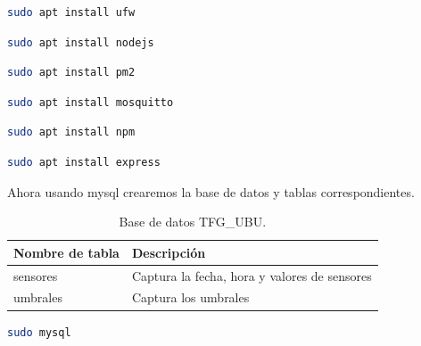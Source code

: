 \begin{lstlisting}[language=sh, firstnumber=0, basicstyle=\normalsize, caption={Comando para instalar ufw.}] 
sudo apt install ufw\end{lstlisting}


\begin{lstlisting}[language=sh, firstnumber=0, basicstyle=\normalsize, caption={Comando para instalar node.js.}] 
sudo apt install nodejs\end{lstlisting}

\begin{lstlisting}[language=sh, firstnumber=0, basicstyle=\normalsize, caption={Comando para instalar pm2.}] 
sudo apt install pm2\end{lstlisting}

\begin{lstlisting}[language=sh, firstnumber=0, basicstyle=\normalsize, caption={Comando para instalar mosquitto.}] 
sudo apt install mosquitto\end{lstlisting}

\begin{lstlisting}[language=sh, firstnumber=0, basicstyle=\normalsize, caption={Comando para instalar npm.}] 
sudo apt install npm\end{lstlisting}

\begin{lstlisting}[language=sh, firstnumber=0, basicstyle=\normalsize, caption={Comando para instalar express.}] 
sudo apt install express\end{lstlisting}

Ahora usando mysql crearemos la base de datos y tablas correspondientes.

\begin{table}[htbp]
\begin{center}
\caption{Base de datos TFG\_UBU.}
\begin{tabular}{|l|l|} %
\hline
\rowcolor[HTML]{C0C0C0} 
\textbf{Nombre de tabla} & \textbf{Descripción}\\ \hline
sensores &  Captura la fecha, hora y valores de sensores\\ \hline
umbrales & Captura los umbrales \\ \hline
\end{tabular}
\label{tabla:BDTFG}
\end{center}
\end{table}


\begin{lstlisting}[language=sh, firstnumber=0, basicstyle=\normalsize, caption={Comando para acceder a Mysql.}] 
sudo mysql\end{lstlisting}

